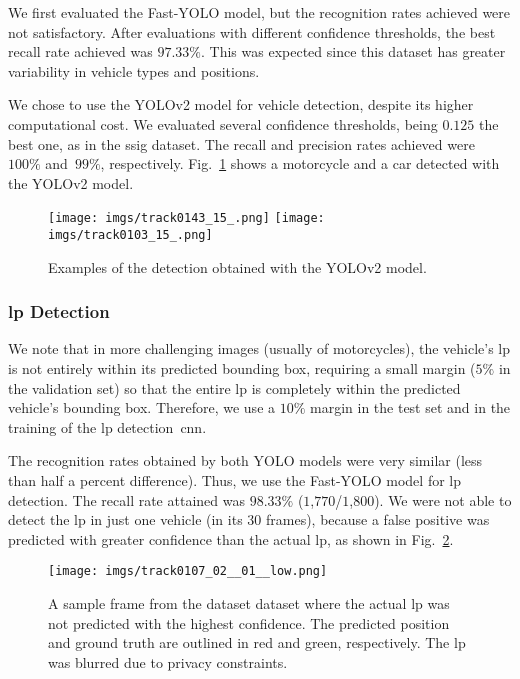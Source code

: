We first evaluated the Fast-YOLO model, but the recognition rates achieved were not satisfactory. After evaluations with different confidence thresholds, the best recall rate achieved was $97.33\%$. This was expected since this dataset has greater variability in vehicle types and positions. 

We chose to use the YOLOv2 model for vehicle detection, despite its higher computational cost. We evaluated several confidence thresholds, being $0.125$ the best one, as in the \gls*{ssig} dataset. The recall and precision rates achieved were $100\%$ and~$99\%$, respectively. 
Fig.~\ref{fig:vehicle_detect_ufpr} shows a motorcycle and a car detected with the YOLOv2 model.

\begin{figure}[!htb]
	\centering
	\texttt{[image: imgs/track0143\_15\_.png]}
	\texttt{[image: imgs/track0103\_15\_.png]}
	\caption{Examples of the detection obtained with the YOLOv2 model.}
	\label{fig:vehicle_detect_ufpr}    
\end{figure}

\subsubsection{\gls*{lp} Detection}

We note that in more challenging images (usually of motorcycles), the vehicle's \gls*{lp} is not entirely within its predicted bounding box, requiring a small margin ($5\%$ in the validation set) so that the entire \gls*{lp} is completely within the predicted vehicle's bounding box. Therefore, we use a $10\%$ margin in the test set and in the training of the \gls*{lp} detection~\gls*{cnn}. 

The recognition rates obtained by both YOLO models were very similar (less than half a percent difference). Thus, we use the Fast-YOLO model for \gls*{lp} detection. The recall rate attained was $98.33\%$ ($1$,$770$/$1$,$800$). We were not able to detect the \gls*{lp} in just one vehicle (in its $30$ frames), because a false positive was predicted with greater confidence than the actual \gls*{lp}, as shown in Fig.~\ref{fig:dataset_lp_fp}.

\begin{figure}[!htb]
	\centering
	\texttt{[image: imgs/track0107\_02\_\_01\_\_low.png]}
	\caption{A sample frame from the \gls*{dataset} dataset where the actual \gls*{lp} was not predicted with the highest confidence. The predicted position and ground truth are outlined in red and green, respectively. The \gls*{lp} was blurred due to privacy constraints.}
	\label{fig:dataset_lp_fp}    
\end{figure}

